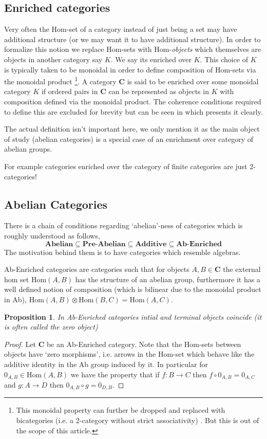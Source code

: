 \documentclass[12pt]{article}
\numberwithin{equation}{section}
\newcommand{\Hom}{{\mathrm{Hom}}}
\newtheorem{proposition}{Proposition}[section]
\begin{document}
\begin{appendices}
		\subsection{Enriched categories}
		Very often the Hom-set of a category instead of just being a set may have additional structure (or we may want it to have additional structure). In order to formalize this notion we replace Hom-sets with Hom-\textit{objects} which themselves are objects in another category say $K$. We say its enriched over $K$. This choice of $K$ is typically taken to be monoidal in order to define composition of Hom-sets via the monoidal product \footnote{This monoidal property can further be dropped and replaced with bicategories (i.e. a 2-category without strict associativity) \cite{garner2015enriched}. But this is out of the scope of this article.}. A category $\mathbf{C}$ is said to be enriched over some monoidal category $K$ if ordered pairs in $\mathbf{C}$ can be represented as objects in $K$ with composition defined via the monoidal product. The coherence conditions required to define this are excluded for brevity but can be seen in \cite[Chp. ~3]{riehl_2014} which presents it clearly.
		
		The actual definition isn't important here, we only mention it as the main object of study (abelian categories) is a special case of an enrichment over category of abelian groups.
		
		For example categories enriched over the category of finite categories are just 2-categories!
		\subsection{Abelian Categories}
		There is a chain of conditions regarding `abelian'-ness of categories which is roughly understood as follows,
		\[ \textbf{Abelian} \subseteq \textbf{Pre-Abelian} \subseteq \textbf{Additive} \subseteq \textbf{Ab-Enriched}\]
		The motivation behind them is to have categories which resemble algebras.
		
		Ab-Enriched categories are categories such that for objects $A,B \in \mathbf{C}$ the external hom set $\Hom(A,B)$ has the structure of an abelian group, furthermore it has a well defined notion of composition (which is bilinear due to the monoidal product in Ab), $\Hom(A,B)\otimes \Hom(B,C) =\Hom(A,C)$. 
		\begin{proposition}
			In Ab-Enriched categories intial and terminal objects coincide (it is often called the zero object)
		\end{proposition}
		\begin{proof}
			Let $\mathbf{C}$ be an Ab-Enriched category. Note that the Hom-sets between objects have `zero morphisms', i.e. arrows in the Hom-set which behave like the additive identity in the Ab group induced by it. In particular for $0_{A,B}\in \Hom(A,B)$ we have the property that if $f:B \to C$ then $f\circ 0_{A,B}=0_{A,C}$ and $g: A \to D$ then $0_{A,B}\circ g=0_{D,B}$.
			

\end{proof}
\end{appendices}
\end{document}
